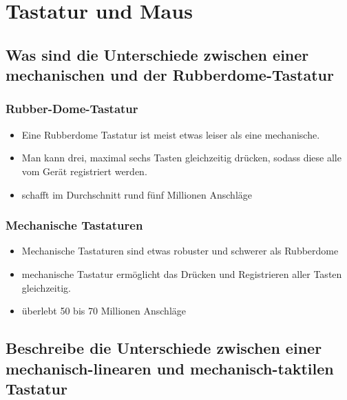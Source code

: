 \documentclass[a4paper]{article}
\begin{document}
    \section{Tastatur und Maus}\label{sec:tastatur-und-maus}
    \subsection{\color{red} Was sind die Unterschiede zwischen einer mechanischen und der Rubberdome-Tastatur}\label{subsec:was-sind-die-unterschiede-zwischen-einer-mechanischen-und-der-rubberdome-tastatur}
    \begin{multicols}{2}
        \subsubsection{\color{codegreen} Rubber-Dome-Tastatur}
        \begin{itemize}
            \color{blue}
            \item Eine Rubberdome Tastatur ist meist etwas leiser als eine mechanische.
            \item Man kann drei, maximal sechs Tasten gleichzeitig drücken, sodass diese alle vom Gerät registriert werden.
            \item schafft im Durchschnitt rund fünf Millionen Anschläge
        \end{itemize}
        \subsubsection{\color{codegreen} Mechanische Tastaturen}
        \begin{itemize}
            \color{blue}
            \item Mechanische Tastaturen sind etwas robuster und schwerer als Rubberdome
            \item mechanische Tastatur ermöglicht das Drücken und Registrieren aller Tasten gleichzeitig.
            \item überlebt 50 bis 70 Millionen Anschläge
        \end{itemize}
    \end{multicols}
    \subsection{\color{red}Beschreibe die Unterschiede zwischen einer mechanisch-linearen und mechanisch-taktilen Tastatur}\label{subsec:beschreibe-die-unterschiede-zwischen-einer-mechanisch-linearen-und-mechanisch-taktilen-tastatur}
\end{document}
